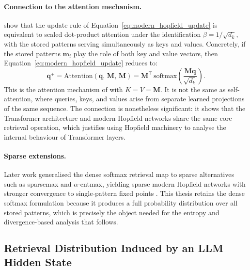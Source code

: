 \paragraph{Connection to the attention mechanism.}
\citet{ramsauer2020hopfield} show that the update rule of
Equation~\eqref{eq:modern_hopfield_update} is equivalent to scaled dot-product
attention under the identification $\beta = 1/\sqrt{d_k}$, with the stored patterns
serving simultaneously as keys and values. Concretely, if the stored patterns
$\mathbf{m}_i$ play the role of both key and value vectors, then
Equation~\eqref{eq:modern_hopfield_update} reduces to:
\begin{equation}
    \mathbf{q}^{+}
    =
    \mathrm{Attention}\!\left(\mathbf{q},\,\mathbf{M},\,\mathbf{M}\right)
    =
    \mathbf{M}^{\top}\,\mathrm{softmax}\!\!\left(
        \frac{\mathbf{M}\mathbf{q}}{\sqrt{d_k}}
    \right).
    \label{eq:mhn_attention_equiv}
\end{equation}
This is the attention mechanism of \citet{vaswani2017attention} with $K = V =
\mathbf{M}$. It is not the same as self-attention, where queries, keys, and values
arise from separate learned projections of the same sequence. The connection is
nonetheless significant: it shows that the Transformer architecture and modern
Hopfield networks share the same core retrieval operation, which justifies using
Hopfield machinery to analyse the internal behaviour of Transformer layers.

\paragraph{Sparse extensions.}
Later work generalised the dense softmax retrieval map to sparse alternatives such
as sparsemax and $\alpha$-entmax, yielding sparse modern Hopfield networks with
stronger convergence to single-pattern fixed points \citep{martins2023sparse}. This
thesis retains the dense softmax formulation because it produces a full probability
distribution over all stored patterns, which is precisely the object needed for the
entropy and divergence-based analysis that follows.

\subsection{Retrieval Distribution Induced by an LLM Hidden State}
\label{subsec:retrieval_distribution_llm}


